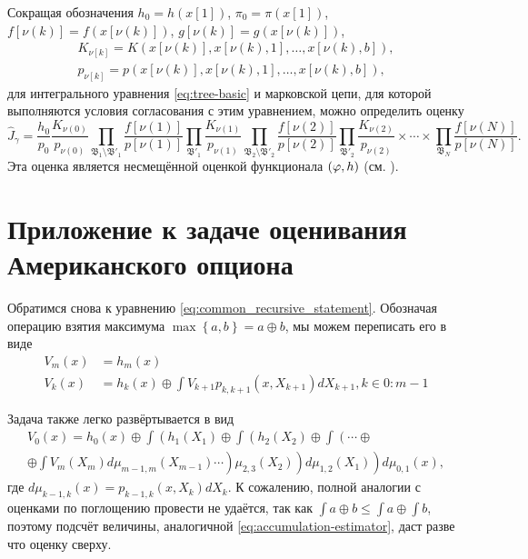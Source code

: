 Сокращая обозначения $h_0 = h(x[1])$, $\pi_0 = \pi(x[1])$, $f[\nu(k)] = f\left(x\left[\nu\left(k\right)\right]\right)$, $g[\nu(k)] = g\left(x\left[\nu\left(k\right)\right]\right)$, 
\begin{align*}
K_{\nu[k]} = K\left(x\left[\nu(k)\right], x\left[\nu(k),1\right], \ldots ,x\left[\nu(k),b\right]\right), \\
p_{\nu[k]} = p\left(x\left[\nu(k)\right], x\left[\nu(k),1\right], \ldots ,x\left[\nu(k),b\right]\right),
\end{align*}
для интегрального уравнения \eqref{eq:tree-basic} и марковской цепи, для которой выполняются условия согласования с этим уравнением, можно определить оценку
\begin{equation}\label{eq:accumulation-estimator}
	\hat{J}_\gamma = \frac{h_0}{p_0}\frac{K_{\nu(0)}}{p_{\nu(0)}}\prod_{\mathfrak{B}_1\setminus\mathfrak{B}'_1}\frac{f\left[\nu\left(1\right)\right]}{p\left[\nu\left(1\right)\right]}\prod_{\mathfrak{B}'_1} \frac{K_{\nu(1)}}{p_{\nu(1)}}\prod_{\mathfrak{B}_2\setminus\mathfrak{B}'_2}\frac{f\left[\nu\left(2\right)\right]}{p\left[\nu\left(2\right)\right]}\prod_{\mathfrak{B}'_2} \frac{K_{\nu(2)}}{p_{\nu(2)}}\times\cdots\times\prod_{\mathfrak{B}_N} \frac{f\left[\nu\left(N\right)\right]}{p\left[\nu\left(N\right)\right]}.
\end{equation}
Эта оценка является несмещённой оценкой функционала $\left(\varphi, h\right)$ (см. \cite{montekarlo1975}).


\section{Приложение к задаче оценивания Американского опциона}
Обратимся снова к уравнению \eqref{eq:common_recursive_statement}. Обозначая операцию взятия максимума $\max\left\lbrace a, b\right\rbrace = a\oplus b$, мы можем переписать его в виде
$$
	\begin{aligned}
		V_m\left(x\right) &= h_m\left(x\right) \\
		V_k\left(x\right) &= h_k\left(x\right)\oplus \int V_{k+1}p_{k, k+1}\left(x, X_{k+1}\right) dX_{k+1}, k\in 0:m-1
	\end{aligned}
$$

Задача также легко развёртывается в вид 
\begin{multline*}
	V_0\left(x\right) = h_0\left(x\right)\oplus\int\left(h_1\left(X_1\right)\oplus\int\left(h_2\left(X_2\right)\oplus\int\left(\cdots\oplus\right.\right.\right.\\
	\left.\left.\left.\oplus\int V_m\left(X_m\right)d\mu_{m-1, m}\left(X_{m-1}\right)\cdots\right)\mu_{2,3}\left(X_2\right)\right)d\mu_{1,2}\left(X_1\right)\right)d\mu_{0,1}(x),
\end{multline*}
где $d\mu_{k-1,k}(x) = p_{k-1, k}(x, X_k)dX_k$. К сожалению, полной аналогии с оценками по поглощению провести не удаётся, так как $\int a\oplus b \leq \int a \oplus \int b$, поэтому подсчёт величины, аналогичной \eqref{eq:accumulation-estimator}, даст разве что оценку сверху. 

